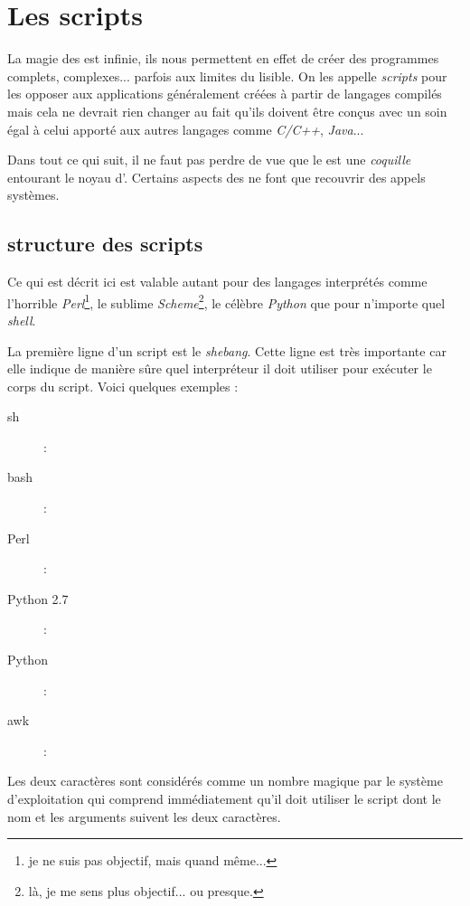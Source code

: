 
\section{Les scripts \shell}
La magie des \shells est infinie, ils nous permettent en effet de créer des programmes complets, complexes... parfois aux limites du lisible. On les appelle \emph{scripts} pour les opposer aux applications généralement créées à partir de langages compilés mais cela ne devrait rien changer au fait qu'ils doivent être conçus avec un soin égal à celui apporté aux autres langages comme \emph{C/C++}, \emph{Java}...

Dans tout ce qui suit, il ne faut pas perdre de vue que le \shell est une \emph{coquille} entourant le noyau d'\unix. Certains aspects des \shells ne font que recouvrir des appels systèmes.

\subsection{structure des scripts}
Ce qui est décrit ici est valable autant pour des langages interprétés comme l'horrible \emph{Perl}\footnote{je ne suis pas objectif, mais quand même...}, le sublime \emph{Scheme}\footnote{là, je me sens plus objectif... ou presque.}, le célèbre \emph{Python} que pour n'importe quel \emph{shell}.

La première ligne d'un script est le \emph{shebang}. Cette ligne est très importante car elle indique de manière sûre quel interpréteur il doit utiliser pour exécuter le corps du script. Voici quelques exemples :

\begin{description}
\item[sh] : 
\item[bash] : 
\item[Perl] : 
\item[Python 2.7] : 
\item[Python] : 
\item[awk] : 
\end{description}

Les deux caractères \code{\#!} sont considérés comme un nombre magique par le système d'exploitation qui comprend immédiatement qu'il doit utiliser le script dont le nom et les arguments suivent les deux caractères.


